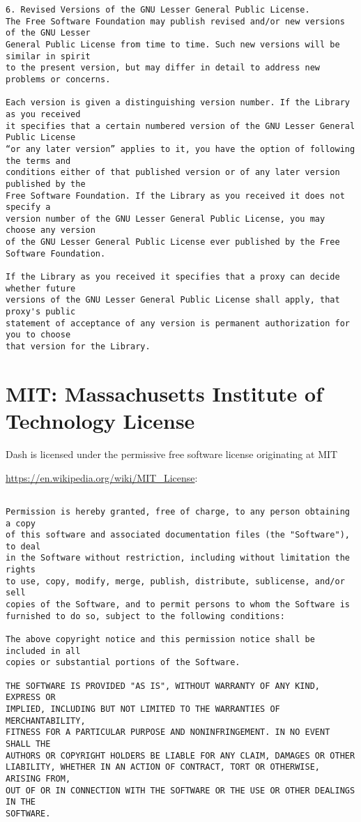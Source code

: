 \begin{verbatim}
6. Revised Versions of the GNU Lesser General Public License.
The Free Software Foundation may publish revised and/or new versions of the GNU Lesser
General Public License from time to time. Such new versions will be similar in spirit
to the present version, but may differ in detail to address new problems or concerns.

Each version is given a distinguishing version number. If the Library as you received
it specifies that a certain numbered version of the GNU Lesser General Public License
“or any later version” applies to it, you have the option of following the terms and
conditions either of that published version or of any later version published by the
Free Software Foundation. If the Library as you received it does not specify a
version number of the GNU Lesser General Public License, you may choose any version
of the GNU Lesser General Public License ever published by the Free Software Foundation.

If the Library as you received it specifies that a proxy can decide whether future
versions of the GNU Lesser General Public License shall apply, that proxy's public
statement of acceptance of any version is permanent authorization for you to choose
that version for the Library.
\end{verbatim}
\normalsize
\section{MIT: Massachusetts Institute of Technology License}

Dash is licensed under the permissive free software license originating at \ac{MIT}

\url{https://en.wikipedia.org/wiki/MIT_License}:
\scriptsize
\begin{verbatim}

Permission is hereby granted, free of charge, to any person obtaining a copy
of this software and associated documentation files (the "Software"), to deal
in the Software without restriction, including without limitation the rights
to use, copy, modify, merge, publish, distribute, sublicense, and/or sell
copies of the Software, and to permit persons to whom the Software is
furnished to do so, subject to the following conditions:

The above copyright notice and this permission notice shall be included in all
copies or substantial portions of the Software.

THE SOFTWARE IS PROVIDED "AS IS", WITHOUT WARRANTY OF ANY KIND, EXPRESS OR
IMPLIED, INCLUDING BUT NOT LIMITED TO THE WARRANTIES OF MERCHANTABILITY,
FITNESS FOR A PARTICULAR PURPOSE AND NONINFRINGEMENT. IN NO EVENT SHALL THE
AUTHORS OR COPYRIGHT HOLDERS BE LIABLE FOR ANY CLAIM, DAMAGES OR OTHER
LIABILITY, WHETHER IN AN ACTION OF CONTRACT, TORT OR OTHERWISE, ARISING FROM,
OUT OF OR IN CONNECTION WITH THE SOFTWARE OR THE USE OR OTHER DEALINGS IN THE
SOFTWARE.

\end{verbatim}
\normalsize
